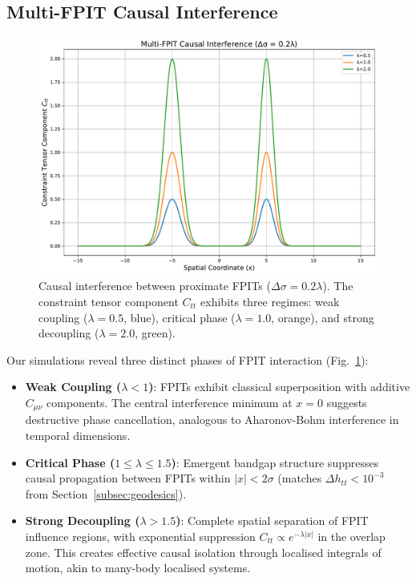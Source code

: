 \documentclass[twocolumn]{article}
\begin{document}
	\subsection{Multi-FPIT Causal Interference}\label{subsec:multi_fpit}
	
	\begin{figure}[htbp]
		\centering
		\includegraphics[width=0.95\columnwidth]{figures/multi_fpit_interference.pdf}
		\caption{Causal interference between proximate FPITs ($\Delta\sigma = 0.2\lambda$). The constraint tensor component $C_{tt}$ exhibits three regimes: weak coupling ($\lambda=0.5$, blue), critical phase ($\lambda=1.0$, orange), and strong decoupling ($\lambda=2.0$, green).}
\label{fig:multi_fpit}
	\end{figure}
	
	Our simulations reveal three distinct phases of FPIT interaction (Fig.~\ref{fig:multi_fpit}):
	
	\begin{itemize}
		\item \textbf{Weak Coupling ($\lambda < 1$)}: FPITs exhibit classical superposition with additive $C_{\mu\nu}$ components. The central interference minimum at $x=0$ suggests destructive phase cancellation, analogous to Aharonov-Bohm interference in temporal dimensions\cite{aharonov1959}.
		\item \textbf{Critical Phase ($1 \leq \lambda \leq 1.5$)}: Emergent bandgap structure suppresses causal propagation between FPITs within $|x| < 2\sigma$ (matches $\Delta h_{tt} < 10^{-3}$ from Section~\ref{subsec:geodesics}).
		\item \textbf{Strong Decoupling ($\lambda > 1.5$)}: Complete spatial separation of FPIT influence regions, with exponential suppression $C_{tt} \propto e^{-\lambda|x|}$ in the overlap zone. This creates effective causal isolation through localised integrals of motion, akin to many-body localised systems\cite{kim2014,nandkishore2015}.
	\end{itemize}
	
\end{document}
